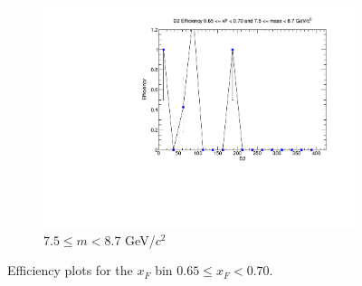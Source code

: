 \begin{figure}[p]
\begin{subfigure}[b]{0.32\textwidth}
        \includegraphics[width=\textwidth]{./kTrackerEfficiencyPlots/D2_Efficiency_xF13_mass10.pdf}
        \caption{$7.5 \leq m < 8.7$ GeV/$c^2$}
        \label{fig:xF13_mass10}
    \end{subfigure}
    \hfill
    \caption{Efficiency plots for the $x_F$ bin $0.65 \leq x_F < 0.70$.}
    \label{fig:xF13}
\end{figure}

\clearpage

